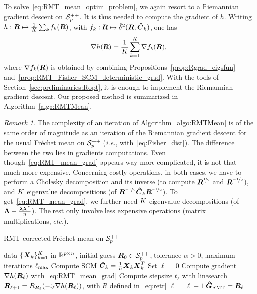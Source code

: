 \documentclass{article}
\theoremstyle{plain}
\theoremstyle{definition}
\theoremstyle{remark}
\newtheorem{remark}[theorem]{Remark}
\begin{document}
To solve~\eqref{eq:RMT_mean_optim_problem}, we again resort to a Riemannian gradient descent on $\mathcal{S}^{++}_{p}$.
It is thus needed to compute the gradient of $h$.
Writing $h:\boldsymbol{R}\mapsto\frac1{K}\sum_k f_k(\boldsymbol{R})$, with $f_k:\boldsymbol{R}\mapsto\hat{\delta}^2(\boldsymbol{R},\boldsymbol{\hat{C}}_k)$, one has
\begin{equation}
    \nabla h(\boldsymbol{R}) = \frac1{K} \sum_{k=1}^K \nabla f_k(\boldsymbol{R}),
\label{eq:RMT_mean_grad}
\end{equation}
where $\nabla f_k(\boldsymbol{R})$ is obtained by combining Propositions~\ref{prop:Rgrad_eigsfun} and~\ref{prop:RMT_Fisher_SCM_deterministic_grad}.
With the tools of Section~\ref{sec:preliminaries:Ropt}, it is enough to implement the Riemannian gradient descent.
Our proposed method is summarized in Algorithm~\ref{algo:RMTMean}.

\begin{remark}
    The complexity of an iteration of Algorithm~\ref{algo:RMTMean} is of the same order of magnitude as an iteration of the Riemannian gradient descent for the usual Fréchet mean on $\mathcal{S}^{++}_{p}$ (\emph{i.e.}, with~\eqref{eq:Fisher_dist}).
    The difference between the two lies in gradients computations.
    Even though~\eqref{eq:RMT_mean_grad} appears way more complicated, it is not that much more expensive.
    Concerning costly operations, in both cases, we have to perform a Cholesky decomposition and its inverse (to compute $\boldsymbol{R}^{\nicefrac12}$ and $\boldsymbol{R}^{\nicefrac{-1}2}$), and $K$ eigenvalue decompositions (of $\boldsymbol{R}^{\nicefrac{-1}2}\boldsymbol{\hat{C}}_k\boldsymbol{R}^{\nicefrac{-1}2}$).
    To get~\eqref{eq:RMT_mean_grad}, we further need $K$ eigenvalue decompositions (of $\boldsymbol{\Lambda}-\frac{\boldsymbol{\lambda}\boldsymbol{\lambda}^T}{n}$).
    The rest only involve less expensive operations (matrix multiplications, \emph{etc.}).
\end{remark}

\begin{algorithm}
    \caption{RMT corrected Fréchet mean on $\mathcal{S}^{++}_{p}$}
    \label{algo:RMTMean}
    \begin{algorithmic}
            data $\{\boldsymbol{X}_k\}_{k=1}^{K}$ in $\mathbb{R}^{p\times n}$,
            initial guess $\boldsymbol{R}_0\in\mathcal{S}^{++}_{p}$,
            tolerance $\alpha>0$,
            maximum iterations $\ell_{\textup{max}}$
        \STATE Compute SCM $\boldsymbol{\hat{C}}_k=\frac1{n}\boldsymbol{X}_k\boldsymbol{X}_k^T$
        \ENDFOR
        \STATE Set $\ell=0$
        \REPEAT
        \STATE Compute gradient $\nabla h(\boldsymbol{R}_{\ell})$ with~\eqref{eq:RMT_mean_grad}
        \STATE Compute stepsize $t_{\ell}$ with linesearch
        \STATE $\boldsymbol{R}_{\ell+1} = R_{\boldsymbol{R}_{\ell}}(-t_{\ell}\nabla h(\boldsymbol{R}_{\ell}))$, with $R$ defined in~\eqref{eq:retr}
        \STATE $\ell=\ell+1$
         $\boldsymbol{\hat{G}}_{\textup{RMT}}=\boldsymbol{R}_{\ell}$
    \end{algorithmic}
\end{algorithm}
\end{document}
